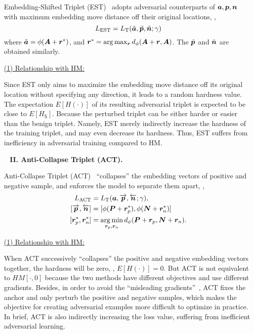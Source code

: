 Embedding-Shifted Triplet (EST)~\cite{advrank} adopts adversarial counterparts
of ${\bm{a}},{\bm{p}},{\bm{n}}$ with maximum embedding move distance off their original
locations, \ie,
%
\begin{equation}
%
L_\text{EST}=L_\text{T}(\tilde{\va},\tilde{\vp},\tilde{\vn};\gamma)
%
\end{equation}
%
where
$\tilde{{\bm{a}}}=\phi({\bm{A}}+{\bm{r}}^*)$, and ${\bm{r}}^*=\arg\max_{{\bm{r}}}d_\phi({\bm{A}}+{\bm{r}}, {\bm{A}})$.
%
The $\tilde{{\bm{p}}}$ and $\tilde{{\bm{n}}}$ are obtained similarly.

\ul{(1) Relationship with HM:}

Since EST only aims to maximize the embedding move distance off its original
location without specifying any direction, it leads to a random hardness value.
%
The expectation $E[H(\cdot)]$ of its resulting adversarial triplet is expected
to be close to $E[H_\mathsf{S}]$.
%
Because the perturbed triplet can be either harder or easier than the benign
triplet.
%
Namely, EST merely indirectly increase the hardness of the training triplet,
and may even decrease its hardness.
%
Thus, EST suffers from inefficiency in adversarial training compared to HM.

~\newline
\noindent\textbf{II. Anti-Collapse Triplet (ACT).}~\cite{robrank}

Anti-Collapse Triplet (ACT)~\cite{robrank} ``collapses'' the embedding vectors
of positive and negative sample, and enforces the model to separate them apart,
\ie,
%
\begin{align}
%
	L_\text{ACT} &=L_\text{T}(\va, \overrightarrow{\vp},
\overleftarrow{\vn};\gamma),\\
%
	[\overrightarrow{\vp},\overleftarrow{\vn}] & =[\phi(\mP+\vr_p^*), \phi(\mN+\vr_n^*)]\\
%
	[\vr_p^*,\vr_n^*] &= \argmin_{\vr_p,\vr_n} d_\phi(\mP+\vr_p, \mN+\vr_n).
%
\end{align}

\ul{(1) Relationship with HM:}

When ACT successively ``collapses'' the positive and negative embedding
vectors together, the hardness will be zero, \ie, $E[H(\cdot)]=0$.
%
But ACT is not equivalent to $HM[\cdot,0]$ because the two methods have
different objectives and use different gradients.
%
Besides, in order to avoid the ``misleading gradients''~\cite{robrank}, ACT
fixes the anchor and only perturb the positive and negative samples, which
makes the objective for creating adversarial examples more difficult to
optimize in practice.
%
In brief, ACT is also indirectly increasing the loss value, suffering from
inefficient adversarial learning.


